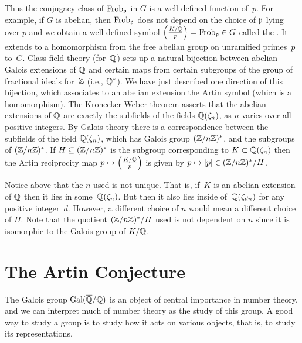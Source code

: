 Thus the conjugacy class of $\operatorname{Frob}_{\mathfrak{p}}$ in $G$ is a well-defined
function of~$p$.  For example, if $G$ is abelian, then $\operatorname{Frob}_{\mathfrak{p}}$ does
not depend on the choice of $\mathfrak{p}$ lying over $p$ and we obtain a well
defined symbol $\left(\frac{K/\mathbb{Q}}{p}\right) =\operatorname{Frob}_{\mathfrak{p}}\in G$ called the .  It extends to a homomorphism from the free abelian
group on unramified primes~$p$ to~$G$.
Class field theory (for~$\mathbb{Q}$) sets up a natural bijection
between abelian Galois extensions of $\mathbb{Q}$ and certain maps from
certain subgroups of the group of fractional ideals for~$\mathbb{Z}$ (i.e., $\mathbb{Q}^*$).
  We have
just described one direction of this bijection, which associates to an
abelian extension the Artin symbol (which is a homomorphism).
The Kronecker-Weber theorem asserts that the abelian extensions of
$\mathbb{Q}$ are exactly the subfields of the fields $\mathbb{Q}(\zeta_n)$, as $n$
varies over all positive integers.  By Galois theory there is a
correspondence between the subfields of the field $\mathbb{Q}(\zeta_n)$,
which has Galois group $(\mathbb{Z}/n\mathbb{Z})^*$, and the subgroups of $(\mathbb{Z}/n\mathbb{Z})^*$.
If $H \subseteq (\mathbb{Z}/n\mathbb{Z})^*$ is the subgroup corresponding to
$K \subset \mathbb{Q}(\zeta_n)$ then the Artin reciprocity map
$p\mapsto \left(\frac{K/\mathbb{Q}}{p}\right)$ is given by $p\mapsto [p]\in (\mathbb{Z}/n\mathbb{Z})^*/H$.

\begin{remark}
	Notice above that the $n$ used is not unique. That is,
	if~$K$ is an abelian extension of $\mathbb{Q}$ then it lies in some~$\mathbb{Q}(\zeta_n)$.
	But then it also lies inside of~$\mathbb{Q}(\zeta_{dn})$ for any
	positive integer~$d$. However, a different choice of $n$
	would mean a different choice of $H$. Note that the
	quotient $(\mathbb{Z}/n\mathbb{Z})^*/H$ used is not dependent on $n$
	since it is isomorphic to the Galois group of $K/\mathbb{Q}$.
\end{remark}

\section{The Artin Conjecture}\label{sec:artin}

The Galois group $\operatorname{Gal}(\overline{\mathbb{Q}}/\mathbb{Q})$ is an object of central importance
in number theory, and we can interpret much of number theory as the
study of this group.  A good way to study a group is to study how it
acts on various objects, that is, to study its representations.

